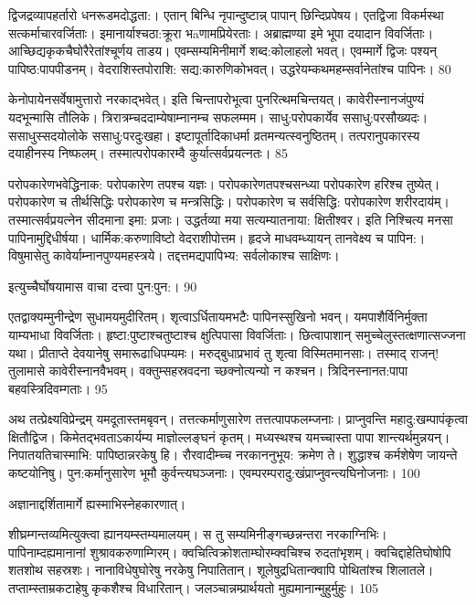 द्विजद्रव्यापहर्तारो धनरूडमदोद्धता:।
एतान् बिन्धि नृपान्दुष्टान्न् पापान् छिन्दिप्रपेषय।
एतद्विजा विकर्मस्था सत्कर्माचारवर्जिताः।
इमानार्याश्चठा:क्रूरा भāणामप्रियेरताः।
अब्राह्मण्या इमे भूपा दयादान विवर्जिताः।
आच्छिद्यकृकचैघोरैरेतांश्चूर्णय ताडय।
एवम्सम्यमिनीमार्गे शब्द:कोलाहलो भवत्।
एवम्मार्गे द्विजः पश्यन् पापिष्ठ:पापपीडनम्।
वेदराशिस्तपोराशि: सद्य:कारुणिकोभवत्।
उद्धरेयम्कथमहम्सर्वानेतांश्च पापिनः।
80



केनोपायेनसर्वेषामुत्तारो नरकाद्भवेत्।
इति चिन्तापरोभूत्वा पुनरित्थमचिन्तयत्।
कावेरीस्नानजंपुण्यं यदभून्मासि तौलिके।
त्रिरात्रम्चददाम्येषाम्नानम्च सफलम्मम।
साधु:परोपकार्येव ससाधु:परसौख्यदः।
ससाधुस्सदयोलोके ससाधु:परदुःखहा।
इष्टापूर्तादिकाधर्मा व्रतमन्यत्स्वनुष्ठितम्।
तत्परानुपकारस्य दयाहीनस्य निष्फलम्।
तस्मात्परोपकारम्वै कुर्यात्सर्वप्रयत्नतः।
85

परोपकारेणभवेद्धिनाक: परोपकारेण तपश्च यज्ञः।
परोपकारेणतपश्चसन्ध्या परोपकारेण हरिश्च तुष्येत्।
परोपकारेण च तीर्थसिद्धिः
परोपकारेण च मन्त्रसिद्धिः।
परोपकारेण च सर्वसिद्धि:
परोपकारेण शरीरदाय॑म्।
तस्मात्सर्वप्रयत्नेन सीदमाना इमा: प्रजाः।
उद्धर्तव्या मया सत्यम्यातनाया: क्षितीश्वर।
इति निश्चित्य मनसा पापिनामुद्दिधीर्षया।
धार्मिक:करुणाविष्टो वेदराशीपोत्तम।
हृदजे माधवम्ध्यायन् तानवेक्ष्य च पापिन:।
विषुमासेतु कावेर्याम्नानपुण्यमहस्त्रये।
तद्दत्तमद्यपापिभ्य: सर्वलोकाश्च साक्षिणः।


इत्युच्चैर्घोषयामास वाचा दत्त्वा पुन:पुन:।
90

एतद्वाक्यम्मुनीन्द्रेण सुधामयमुदीरितम्।
शृत्वाऽर्धितायमभटैः पापिनस्सुखिनो भवन्।
यमपाशैर्विनिर्मुक्ता याम्यभाधा विवर्जिताः।
हृष्टा:पुष्टाश्चतुष्टाश्च क्षुत्पिपासा विवर्जिताः।
छित्वापाशान् समुच्चेलुस्तत्क्षणात्सज्जना यथा।
प्रीताप्ते देवयानेषु समारूढाधिपम्यमः।
मरुद्बुधाप्रभावं तु शृत्वा विस्मितमानसाः।
तस्माद् राजन्! तुलामासे कावेरीस्नानवैभवम्।
वक्तुम्सहस्रवदना च्छक्नोत्यन्यो न कश्चन।
त्रिदिनस्नानत:पापा बहवस्त्रिदिवम्गताः।
95

अथ तत्प्रेक्ष्यविप्रेन्द्रम् यमदूतास्तमबृवन्।
तत्तत्कर्माणुसारेण तत्तत्पापफलम्जनाः।
प्राप्नुवन्ति महादु:खम्पापंकृत्वा क्षितौद्विज।
किमेतद्भवताऽकार्यम्य माज्ञोल्लङ्घनं कृतम्।
मध्यस्थश्च यमच्चास्ता पापा शान्त्यर्थमुन्नयन्।
निपातयतिचास्माभि: पापिष्ठान्नरकेषु हि।
रौरवादीम्च्च नरकाननुभूय: क्रमेण ते।
शुद्धाश्च कर्मशेषेण जायन्ते कष्टयोनिषु।
पुन:कर्मानुसारेण भूमौ कुर्वन्त्यघञ्जनाः।
एवम्परम्परादु:खंप्राप्नुवन्त्यघिनोजनाः।
100

अज्ञानाद्दर्शितामार्गे ह्यस्माभिस्नेहकारणात्।


शीघ्रम्गन्तव्यमित्युक्त्वा ह्यानयम्स्तम्यमालयम्।
स तु सम्यमिनीङ्गच्छन्नन्तरा नरकाग्निभिः।
पापिनाम्दह्यमानानां शुश्रावकरुणाम्गिरम्।
क्वचित्विक्रोशताम्घोरम्क्वचिश्च रुदतांभृशम्।
क्वचिद्दाहेतिघोषोपि शतशोथ सहस्रशः।
नानाविधेषुघोरेषु नरकेषु निपातितान्।
शूलेषुद्रधितान्क्वापि पोथितांश्च शिलातले।
तप्ताम्स्ताम्रकटाहेषु कृकशैश्च विधारितान्।
जलञ्चान्नम्प्रार्थयतो मुह्यमानान्मुहुर्मुहुः।
105

